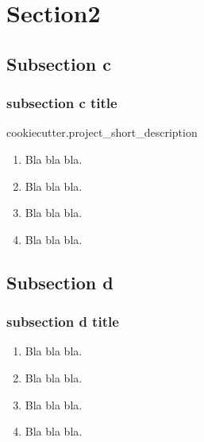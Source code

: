 \section{Section2}
%
\subsection{Subsection c}
\begin{frame}[label=sectionc]
\frametitle{subsection c title} 

{{cookiecutter.project_short_description}}

\begin{enumerate}
\item Bla bla bla.\\
\item Bla bla bla.\\
\item Bla bla bla.\\
\item Bla bla bla.\\
\end{enumerate}
\end{frame}


%
\subsection{Subsection d}
\begin{frame}[label=sectiond]
\frametitle{subsection d title} 
\begin{enumerate}
\item Bla bla bla.\\
\item Bla bla bla.\\
\item Bla bla bla.\\
\item Bla bla bla.\\
\end{enumerate}
\end{frame}
